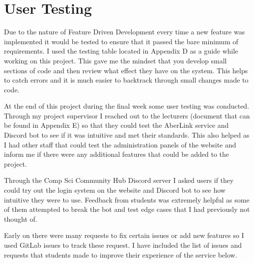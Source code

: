 \section{User Testing}\label{sec4:user-tesing}
Due to the nature of Feature Driven Development every time a new feature was implemented it would be tested to ensure that it passed the bare minimum of requirements. I used the testing table located in Appendix D as a guide while working on this project. This gave me the mindset that you develop small sections of code and then review what effect they have on the system. This helps to catch errors and it is much easier to backtrack through small changes made to code.

At the end of this project during the final week some user testing was conducted. Through my project supervisor I reached out to the lecturers (document that can be found in Appendix E) so that they could test the AberLink service and Discord bot to see if it was intuitive and met their standards. This also helped as I had other staff that could test the administration panels of the website and inform me if there were any additional features that could be added to the project.

Through the Comp Sci Community Hub Discord server I asked users if they could try out the login system on the website and Discord bot to see how intuitive they were to use. Feedback from students was extremely helpful as some of them attempted to break the bot and test edge cases that I had previously not thought of. 

Early on there were many requests to fix certain issues or add new features so I used GitLab issues to track these request. I have included the list of issues and requests that students made to improve their experience of the service below.

